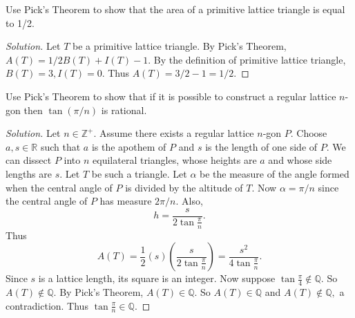 \documentclass[12pt]{article}
\newcommand{\Z}{\mathbb{Z}}
\newcommand{\Q}{\mathbb{Q}}
\newcommand{\R}{\mathbb{R}}
\newenvironment{exercise}[2][Exercise]{\begin{trivlist}
        \item[\hskip \labelsep {\bfseries #1}\hskip \labelsep {\bfseries #2.}]}{\end{trivlist}}
\newenvironment{solution}
        {\begin{proof}[Solution]}
                    {\end{proof}}
\begin{document}
\begin{exercise}{73}
    Use Pick's Theorem to show that the area of a primitive lattice triangle is equal to 1/2.
    \begin{solution}
        Let \( T \) be a primitive lattice triangle. By Pick's Theorem, \( A(T) = 1/2 B(T) + I(T) -1. \) By the definition of primitive lattice triangle, \( B(T) = 3, I(T) = 0 . \) Thus \( A(T) = 3/2 - 1 = 1/2. \)
    \end{solution}
\end{exercise}

\begin{exercise}{74}
    Use Pick's Theorem to show that if it is possible to construct a regular lattice \( n \)-gon then \( \tan(\pi /n) \) is rational.
    \begin{solution}
        Let \( n \in \Z^{+} . \) Assume there exists a regular lattice \( n \)-gon \( P \). Choose \( a,s \in \R \) such that \( a \) is the apothem of \( P \) and \( s \) is the length of one side of \( P. \) We can dissect \( P \) into \( n \) equilateral triangles, whose heights are \( a \) and whose side lengths are \( s. \) Let \( T \) be such a triangle. Let \( \alpha \) be the measure of the angle formed when the central angle of \( P \) is divided by the altitude of \( T . \) Now \( \alpha = \pi /n \) since the central angle of \( P \) has measure \( 2 \pi /n. \) Also, \[ h = \frac{s}{2 \tan \frac{\pi}{n}} . \] Thus \[ A(T) = \frac{1}{2} (s) \left( \frac{s}{2\tan \frac{\pi}{n}} \right) = \frac{s^{2}}{4 \tan \frac{\pi}{n}}. \]
        Since \( s \) is a lattice length, its square is an integer. Now suppose \( \tan \frac{\pi}{4} \notin \Q. \) So \( A(T) \notin \Q. \) By Pick's Theorem, \( A(T) \in \Q. \) So \( A(T) \in \Q \) and \( A(T) \notin \Q, \) a contradiction. Thus \( \tan \frac{\pi}{n} \in \Q. \)
    \end{solution}
\end{exercise}
\end{document}
